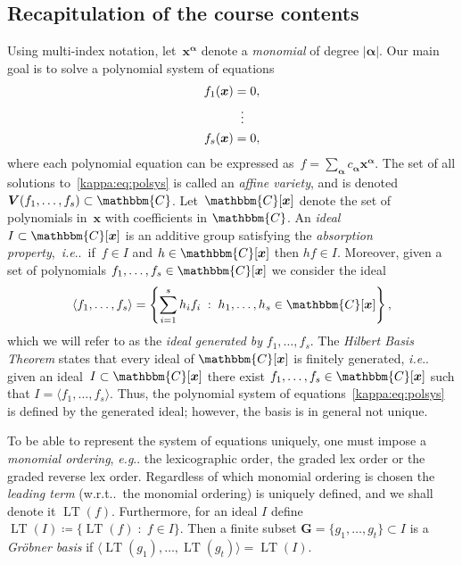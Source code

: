 \documentclass[11pt,a4paper]{article}
\makeatletter
\newcommand{\mat}[1]{\bm{#1}}
\newcommand{\C}{\ensuremath{\mathbbm{C}}}
\DeclareMathOperator{\lt}{LT}
\DeclareRobustCommand\eg{\emph{e.g}\@ifnextchar.{}{.\@}}
\DeclareRobustCommand\ie{\emph{i.e}\@ifnextchar.{}{.\@}}
\DeclareRobustCommand\wrt{w.r.t\@ifnextchar.{}{.\@}}
\makeatother
\begin{document}
\subsection{Recapitulation of the course contents}
Using multi-index notation,
let~$\mat{x^{\alpha}}$ denote a \emph{monomial} of degree $|\mat{\alpha}|$.
Our main goal is to solve a polynomial system of equations
\begin{equation}\label{kappa:eq:polsys}
    \begin{aligned}
    f_1(\mat{x}) & = 0, \\
                 & \hspace{0.575em} \vdots \\
    f_s(\mat{x}) & = 0,
    \end{aligned}
\end{equation}
where each polynomial equation can be expressed
as~$f=\sum_{\mat{\alpha}}c_{\mat{\alpha}}\mat{x^\alpha}$.
The set of all solutions to~\eqref{kappa:eq:polsys} is called an \emph{affine variety}, and is denoted
$\mat{V}(f_1,\ldots,f_s)\subset\C$.
Let~$\C[\mat{x}]$ denote the set
of polynomials in~$\mat{x}$ with coefficients in $\C$.
An \emph{ideal} $I\subset\C[\mat{x}]$ is an additive group satisfying the \emph{absorption property},~\ie{}~if~$f\in I$
and $h\in\C[\mat{x}]$ then $hf\in I$. Moreover, given a set of polynomials $f_1,\ldots,f_s\in\C[\mat{x}]$
we consider the ideal
\begin{equation}
\langle f_1,\ldots,f_s\rangle = \left\{\sum_{i=1}^sh_if_i\;:\;h_1,\ldots,h_s\in\C[\mat{x}]\right\},
\end{equation}
which we will refer to as the \emph{ideal generated by} $f_1,\ldots,f_s$.
The \emph{Hilbert Basis Theorem} states that every ideal of $\C[\mat{x}]$ is
finitely generated, \ie{} given an ideal~$I\subset\C[\mat{x}]$ there exist
$f_1,\ldots,f_s\in\C[\mat{x}]$ such that $I=\langle f_1,\ldots,f_s\rangle$.
Thus, the polynomial system of equations~\eqref{kappa:eq:polsys} is defined by the
generated ideal; however, the basis is in general not unique.

To be able to represent the system of equations uniquely, one must impose
a \emph{monomial ordering}, \eg{} the lexicographic order,
the graded lex order or the graded reverse lex order. Regardless of which monomial ordering
is chosen the \emph{leading term} (\wrt{}~the monomial ordering) is uniquely defined, and we shall
denote it $\lt(f)$. Furthermore, for an ideal $I$ define $\lt(I)\coloneqq\{\lt(f)\;:\;f\in I\}$. Then
a finite subset \mbox{$\mat{G}=\{g_1,\ldots,g_t\}\subset I$} is a \emph{Gröbner basis}
if $\langle\lt(g_1),\ldots,\lt(g_t)\rangle=\lt(I)$.
\end{document}

